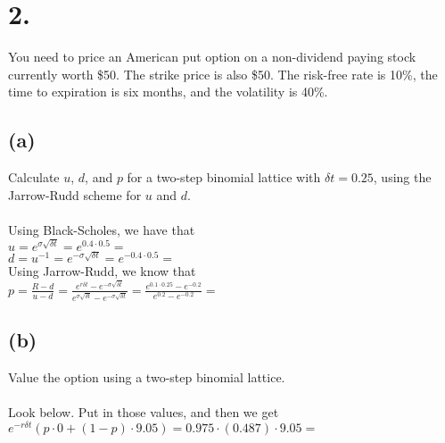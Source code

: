 \documentclass{article}
\begin{document}
\section*{2.}
{\Large

You need to price an American put option on a non-dividend paying stock currently worth \$50.  The strike price is also \$50.  The risk-free rate is 10\%, the time to expiration is six months, and the volatility is 40\%.



\subsection*{(a)}

Calculate $u$, $d$, and $p$ for a two-step binomial lattice with $\delta t = 0.25$, using the Jarrow-Rudd scheme for $u$ and $d$. \\ \\

Using Black-Scholes, we have that \\
$u = e^{\sigma \sqrt{\delta t}} = e^{0.4 \cdot 0.5} = $  \\
$d = u^{-1} = e^{-\sigma \sqrt{\delta t}} = e^{-0.4 \cdot 0.5} = $  \\
Using Jarrow-Rudd, we know that \\
$p = \frac{R - d}{u - d} = \frac{e^{r \delta t} - e^{-\sigma \sqrt{\delta t}}}{e^{\sigma \sqrt{\delta t}} - e^{-\sigma \sqrt{\delta t}}} = \frac{e^{0.1 \cdot 0.25} - e^{-0.2}}{e^{0.2} - e^{-0.2}} = $ 


\subsection*{(b)}

Value the option using a two-step binomial lattice. \\ \\

Look below. Put in those values, and then we get \\
$e^{-r \delta t} (p \cdot 0 + (1-p) \cdot 9.05) = 0.975 \cdot (0.487) \cdot 9.05 = $ 

}
\end{document}
